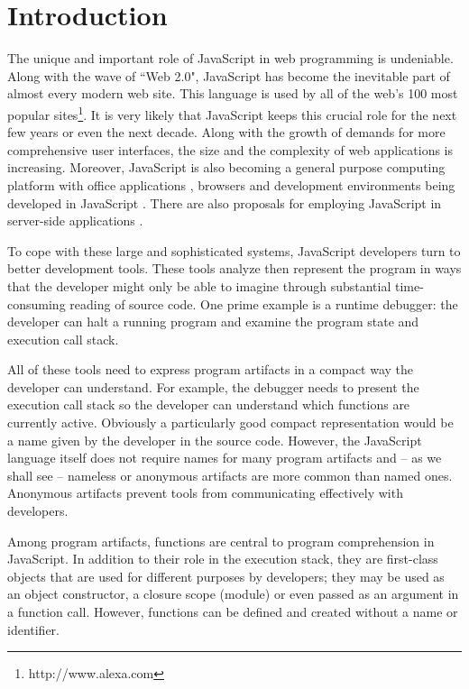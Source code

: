 \documentclass[10pt, preprint]{sigplanconf}
\begin{document}
\section{Introduction}
The unique and important role of JavaScript in web programming is undeniable. Along with the wave of ``Web 2.0", JavaScript has become the inevitable part of almost every modern web site. This language is used by all of the web's 100 most popular sites\footnote[1]{http://www.alexa.com}. It is very likely that JavaScript keeps this crucial role for the next few years or even the next decade. Along with the growth of demands for more comprehensive user interfaces, the size and the complexity of web applications is increasing. Moreover, JavaScript is also becoming a general purpose computing platform with office applications \cite{JSOffice, JSOffice2}, browsers \cite{FAO, GCE} and development environments \cite{Ingalls} being developed in JavaScript \cite{Richards}. There are also proposals for employing JavaScript in server-side applications \cite{SSJSR, CJS}.

To cope with these large and sophisticated systems, JavaScript developers turn to better development tools. These tools analyze then represent the program in ways that the developer might only be able to imagine through substantial time-consuming reading of source code.  One prime example is a runtime debugger: the developer can halt a running program and examine the program state and execution call stack. 

All of these tools need to express program artifacts in a compact way the developer can understand.  For example, the debugger needs to present the execution call stack so the developer can understand which functions are currently active.  Obviously a particularly good compact representation would be a name given by the developer in the source code. However, the JavaScript language itself does not require names for many program artifacts and -- as we shall see -- nameless or anonymous artifacts are more common than named ones. Anonymous artifacts prevent tools from communicating effectively with developers.

Among program artifacts, functions are central to program comprehension in JavaScript. In addition to their role in the execution stack, they are first-class objects that are used for different purposes by developers; they may be used as an object constructor, a closure scope (module) or even  passed as an argument in a function call. However, functions can be defined and created without a name or identifier.  
\end{document}
